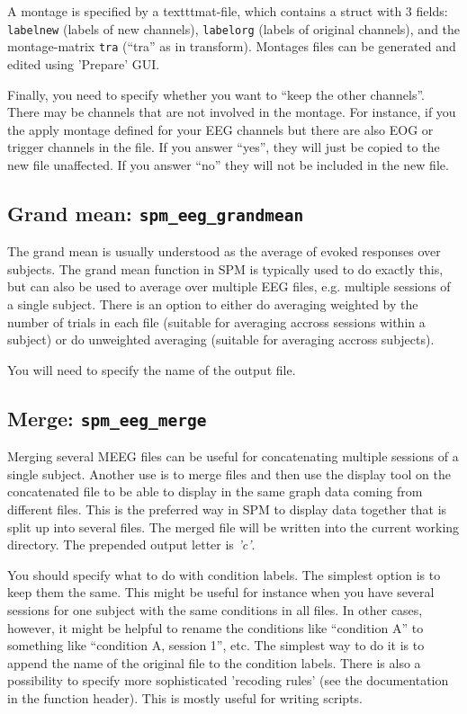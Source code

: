 A montage is specified by a texttt{mat}-file, which contains a struct with 3 fields: \texttt{labelnew} (labels of new channels), \texttt{labelorg} (labels of original channels), and the montage-matrix \texttt{tra} (``tra'' as in transform). Montages files can be generated and edited using 'Prepare' GUI. 

Finally, you need to specify whether you want to ``keep the other channels''. There may be channels that are not involved in the montage. For instance, if you the apply montage defined for your EEG channels but there are also EOG or trigger channels in the file. If you answer ``yes'', they will just be copied to the new file unaffected. If you answer ``no'' they will not be included in the new file.

\subsection{Grand mean: \texttt{spm\_eeg\_grandmean}}
The grand mean is usually understood as the average of evoked responses over subjects. The grand mean function in SPM is typically used to do exactly this, but can also be used to average over multiple EEG files, e.g. multiple sessions of a single subject. There is an option to either do averaging weighted by the number of trials in each file (suitable for averaging accross sessions within a subject) or do unweighted averaging (suitable for averaging accross subjects).

You will need to specify the name of the output file. 

\subsection{Merge: \texttt{spm\_eeg\_merge}}
Merging several MEEG files can be useful for concatenating multiple sessions of a single subject. Another use is to merge files and then use the display tool on the concatenated file to be able to display in the same graph data coming from different files. This is the preferred way in SPM to display data together that is split up into several files. The merged file will be written into the current working directory. The prepended output letter is \textit{'c'}.

You should specify what to do with condition labels. The simplest option is to keep them the same. This might be useful for instance when you have several sessions for one subject with the same conditions in all files. In other cases, however, it might be helpful to rename the conditions like ``condition A'' to something like ``condition A, session 1'', etc. The simplest way to do it is to append the name of the original file to the condition labels. There is also a possibility to specify more sophisticated 'recoding rules' (see the documentation in the function header). This is mostly useful for writing scripts.

